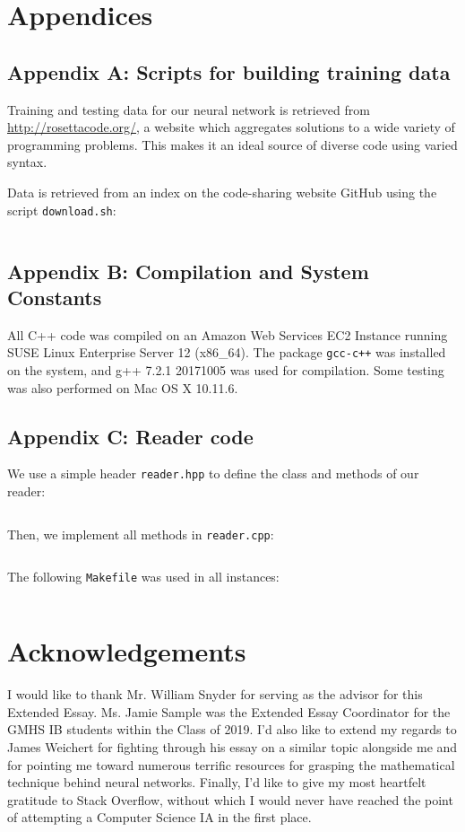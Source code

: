 \documentclass{article}
\begin{document}
\section{Appendices}

\label{sec:appendix_a}
\subsection{Appendix A: Scripts for building training data}
Training and testing data for our neural network is retrieved from \url{http://rosettacode.org/}, a website which aggregates solutions to a wide variety of programming problems. This makes it an ideal source of diverse code using varied syntax.

Data is retrieved from an index on the code-sharing website GitHub\cite{rosettacodegh} using the script \texttt{download.sh}:
\inputminted{bash}{code/data/download.sh}

\label{sec:appendix_b}
\subsection{Appendix B: Compilation and System Constants}
All C++ code was compiled on an Amazon Web Services EC2 Instance running SUSE Linux Enterprise Server 12 (x86\_64). The package \texttt{gcc-c++} was installed on the system, and g++ 7.2.1 20171005 was used for compilation. Some testing was also performed on Mac OS X 10.11.6.

\label{sec:appendix_c}
\subsection{Appendix C: Reader code}
We use a simple header \texttt{reader.hpp} to define the class and methods of our reader:
\inputminted{cpp}{code/reader.hpp}
Then, we implement all methods in \texttt{reader.cpp}:
\inputminted{cpp}{code/reader.cpp}

The following \texttt{Makefile} was used in all instances:
\inputminted{makefile}{code/Makefile}

\section{Acknowledgements}
I would like to thank Mr. William Snyder for serving as the advisor for this Extended Essay. Ms. Jamie Sample was the Extended Essay Coordinator for the GMHS IB students within the Class of 2019. I'd also like to extend my regards to James Weichert for fighting through his essay on a similar topic alongside me and for pointing me toward numerous terrific resources for grasping the mathematical technique behind neural networks. Finally, I'd like to give my most heartfelt gratitude to Stack Overflow, without which I would never have reached the point of attempting a Computer Science IA in the first place.


\end{document}
